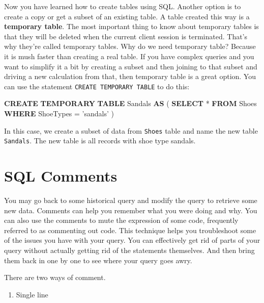 \documentclass[]{book}
\makeatletter
\newenvironment{Shaded}{\begin{snugshade}}{\end{snugshade}}
\newcommand{\KeywordTok}[1]{\textcolor[rgb]{0.13,0.29,0.53}{\textbf{{#1}}}}
\newcommand{\StringTok}[1]{\textcolor[rgb]{0.31,0.60,0.02}{{#1}}}
\newcommand{\NormalTok}[1]{{#1}}
\providecommand{\tightlist}{%
  \setlength{\itemsep}{0pt}\setlength{\parskip}{0pt}}
\newenvironment{kframe}{%
\medskip{}
\setlength{\fboxsep}{.8em}
 \def\at@end@of@kframe{}%
 \ifinner\ifhmode%
  \def\at@end@of@kframe{\end{minipage}}%
  \begin{minipage}{\columnwidth}%
 \fi\fi%
 \def\FrameCommand##1{\hskip\@totalleftmargin \hskip-\fboxsep
 \colorbox{shadecolor}{##1}\hskip-\fboxsep
     \hskip-\linewidth \hskip-\@totalleftmargin \hskip\columnwidth}%
 \MakeFramed {\advance\hsize-\width
   \@totalleftmargin\z@ \linewidth\hsize
   \@setminipage}}%
 {\par\unskip\endMakeFramed%
 \at@end@of@kframe}
\renewenvironment{Shaded}{\begin{kframe}}{\end{kframe}}
\theoremstyle{definition}
\theoremstyle{definition}
\theoremstyle{remark}
\makeatother
\begin{document}
Now you have learned how to create tables using SQL. Another option is
to create a copy or get a subset of an existing table. A table created
this way is a \textbf{temporary table}. The most important thing to know
about temporary tables is that they will be deleted when the current
client session is terminated. That's why they're called temporary
tables. Why do we need temporary table? Because it is mush faster than
creating a real table. If you have complex queries and you want to
simplify it a bit by creating a subset and then joining to that subset
and driving a new calculation from that, then temporary table is a great
option. You can use the statement \texttt{CREATE\ TEMPORARY\ TABLE} to
do this:

\begin{Shaded}
\begin{Highlighting}[]
\KeywordTok{CREATE} \KeywordTok{TEMPORARY} \KeywordTok{TABLE} \NormalTok{Sandals }\KeywordTok{AS}
\NormalTok{(}
\KeywordTok{SELECT} \NormalTok{*}
\KeywordTok{FROM} \NormalTok{Shoes}
\KeywordTok{WHERE} \NormalTok{ShoeTypes = }\StringTok{'sandals'}
\NormalTok{)}
\end{Highlighting}
\end{Shaded}

In this case, we create a subset of data from \texttt{Shoes} table and
name the new table \texttt{Sandals}. The new table is all records with
shoe type sandals.

\section{SQL Comments}\label{sql-comments}

You may go back to some historical query and modify the query to
retrieve some new data. Comments can help you remember what you were
doing and why. You can also use the comments to mute the expression of
some code, frequently referred to as commenting out code. This technique
helps you troubleshoot some of the issues you have with your query. You
can effectively get rid of parts of your query without actually getting
rid of the statements themselves. And then bring them back in one by one
to see where your query goes awry.

There are two ways of comment.

\begin{enumerate}
\def\labelenumi{(\arabic{enumi})}
\tightlist
\item
  Single line
\end{enumerate}
\end{document}
